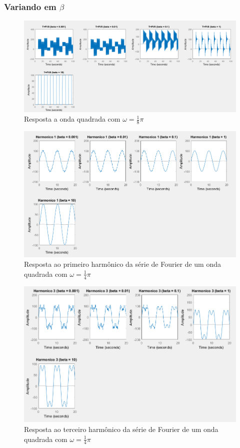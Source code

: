 \documentclass[a4paper, 12pt]{article}
\begin{document}
			\subsubsection{Variando em $\beta$}
			\begin{figure}[!ht]
				\centering
				\includegraphics[scale=0.46]{img/3f_beta.png}
				\caption{Resposta a onda quadrada com $\omega = \frac{1}{8}\pi$}
			\end{figure}
			\begin{figure}[!ht]
				\centering
				\includegraphics[scale=0.57]{img/3g_beta.png}
				\caption{Resposta ao primeiro harmônico da série de Fourier de um onda quadrada com $\omega = \frac{1}{4}\pi$}
			\end{figure}
			\begin{figure}[!ht]
				\centering
				\includegraphics[scale=0.52]{img/3h_beta.png}
				\caption{Resposta ao terceiro harmônico da série de Fourier de um onda quadrada com $\omega = \frac{1}{4}\pi$}
			\end{figure}
\end{document}
